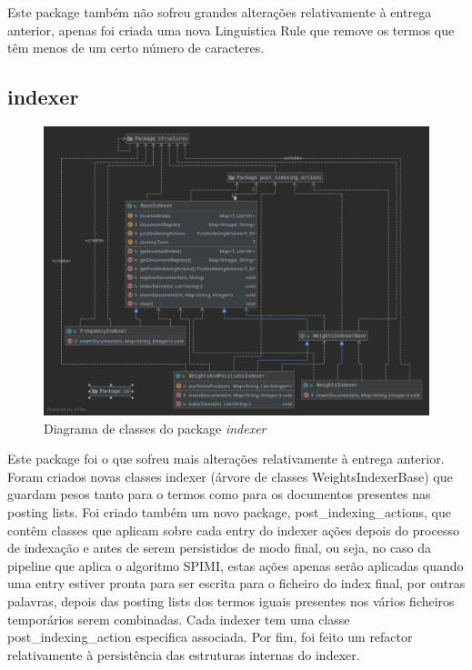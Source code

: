 \documentclass[12pt]{article}
\begin{document}
Este package também não sofreu grandes alterações relativamente à
entrega anterior, apenas foi criada uma nova Linguistica Rule que
remove os termos que têm menos de um certo número de caracteres.

\subsection{indexer}
\begin{figure}[H]
  \center
  \includegraphics[width=\linewidth]{packages_indexer.png}
  \caption{Diagrama de classes do package \it indexer}
\end{figure}

Este package foi o que sofreu mais alterações relativamente à entrega
anterior. Foram criados novas classes indexer (árvore de classes
WeightsIndexerBase) que guardam pesos tanto para o termos como
para os documentos presentes nas posting lists. Foi criado também
um novo package, post\_indexing\_actions, que contêm classes que
aplicam sobre cada entry do indexer ações depois do processo de
indexação e antes de serem persistidos de modo final, ou seja, no
caso da pipeline que aplica o algoritmo SPIMI, estas ações apenas
serão aplicadas quando uma entry estiver pronta para ser escrita
para o ficheiro do index final, por outras palavras, depois das
posting lists dos termos iguais presentes nos vários ficheiros
temporários serem combinadas. Cada indexer tem uma classe
post\_indexing\_action especifica associada. Por fim, foi feito
um refactor relativamente à persistência das estruturas internas
do indexer.
\end{document}
